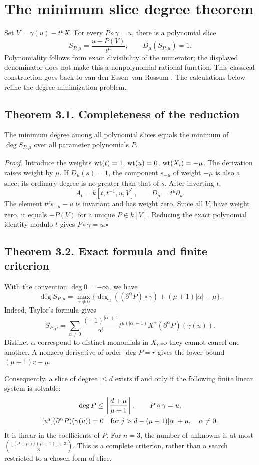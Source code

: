 \section{The minimum slice degree theorem}\label{sec:jets}
Set $V=\gamma(u)-t^\mu X$. For every $P\circ\gamma=u$, there is a polynomial slice
\[
S_{P,\mu}=\frac{u-P(V)}{t^\mu},\qquad D_\mu(S_{P,\mu})=1.
\]
Polynomiality follows from exact divisibility of the numerator; the displayed denominator does not make this a nonpolynomial rational function. This classical construction goes back to van den Essen--van Rossum \cite{vdER}. The calculations below refine the degree-minimization problem.

\subsection*{Theorem 3.1. Completeness of the reduction}
The minimum degree among all polynomial slices equals the minimum of $\deg S_{P,\mu}$ over all parameter polynomials $P$.

\textit{Proof.} Introduce the weights
$\operatorname{wt}(t)=1$, $\operatorname{wt}(u)=0$, $\operatorname{wt}(X_i)=-\mu$. The derivation raises weight by $\mu$. If $D_\mu(s)=1$, the component $s_{-\mu}$ of weight $-\mu$ is also a slice; its ordinary degree is no greater than that of $s$.
After inverting $t$,
\[
A_t=k[t,t^{-1},u,V],\qquad D_\mu=t^\mu\partial_u.
\]
The element $t^\mu s_{-\mu}-u$ is invariant and has weight zero. Since all $V_i$ have weight zero, it equals $-P(V)$ for a unique $P\in k[V]$. Reducing the exact polynomial identity modulo $t$ gives $P\circ\gamma=u$.\hfill$\square$

\subsection*{Theorem 3.2. Exact formula and finite criterion}
With the convention $\deg0=-\infty$, we have
\[
\boxed{\deg S_{P,\mu}=\max_{\alpha\ne0}
\bigl\{\deg_u((\partial^\alpha P)\circ\gamma)
+(\mu+1)|\alpha|-\mu\bigr\}.}
\]
Indeed, Taylor's formula gives
\[
S_{P,\mu}=\sum_{\alpha\ne0}\frac{(-1)^{|\alpha|+1}}{\alpha!}
t^{\mu(|\alpha|-1)}X^\alpha(\partial^\alpha P)(\gamma(u)).
\]
Distinct $\alpha$ correspond to distinct monomials in $X$, so they cannot cancel one another. A nonzero derivative of order $\deg P=r$ gives the lower bound $(\mu+1)r-\mu$.

Consequently, a slice of degree $\le d$ exists if and only if the following finite linear system is solvable:
\[
\begin{gathered}
\deg P\le\left\lfloor\frac{d+\mu}{\mu+1}\right\rfloor,\qquad P\circ\gamma=u,\\
[u^j](\partial^\alpha P)(\gamma(u))=0\quad
\text{for }j>d-(\mu+1)|\alpha|+\mu,\quad\alpha\ne0.
\end{gathered}
\]
It is linear in the coefficients of $P$. For $n=3$, the number of unknowns is at most
$\binom{\lfloor(d+\mu)/(\mu+1)\rfloor+3}{3}$.
This is a complete criterion, rather than a search restricted to a chosen form of slice.

